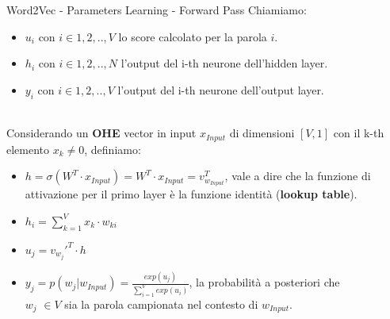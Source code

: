 \documentclass[british]{beamer}
\begin{document}
\begin{frame}{Word2Vec - Parameters Learning - Forward Pass}
	Chiamiamo:
	\begin{itemize}
		\item \(u_i\) con \(i \in {1,2,..,V}\) lo score calcolato per la parola \(i\).
		\item \(h_i\) con \(i \in {1,2,..,N}\) l'output del i-th neurone dell'hidden layer.
		\item \(y_i\) con \(i \in {1,2,..,V}\) l'output del i-th neurone dell'output layer.
		\\~\\
	\end{itemize} 
	Considerando un \textbf{OHE} vector in input \(x_{Input}\) di dimensioni \([V,1]\) con il k-th elemento \(x_k \neq 0\), definiamo:
	\begin{itemize}
		\item \(h = \sigma(W^T \cdot x_{Input}) = W^T \cdot x_{Input} = v_{w_{Input}}^T\), vale a dire che la funzione di attivazione per il primo layer \`{e} la funzione identit\`{a} (\textbf{lookup table}).
		\item \(h_i = \sum_{k=1}^{V} x_k \cdot w_{ki}\)
		\item \(u_j = v_{w_j}'^T \cdot h\)
		\item \( y_{j} = p(w_{j}|w_{Input}) =  \frac{exp(u_{j})}{\sum_{i=1}^{V} exp(u_i)}\), la probabilit\`{a} a posteriori che\\ \(w_{j}\) \(\in V\) sia la parola campionata nel contesto di \(w_{Input}\).
	\end{itemize}
\end{frame}
\end{document}

